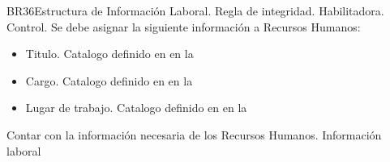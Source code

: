  \begin{BussinesRule}{BR36}{Estructura de Información Laboral.}
     \BRitem[Tipo:] Regla de integridad.
     \BRitem[Clase:] Habilitadora.
     \BRitem[Nivel:] Control.
     \BRitem[Descripción:]Se debe asignar la siguiente información a Recursos Humanos:
     \begin{itemize}
        \item Titulo. Catalogo definido en en la 
        \item Cargo. Catalogo definido en en la 
        \item Lugar de trabajo. Catalogo definido en en la 
     \end{itemize}
     \BRitem[Motivación:] Contar con la información necesaria de los Recursos Humanos.
      Información laboral
  \end{BussinesRule}
